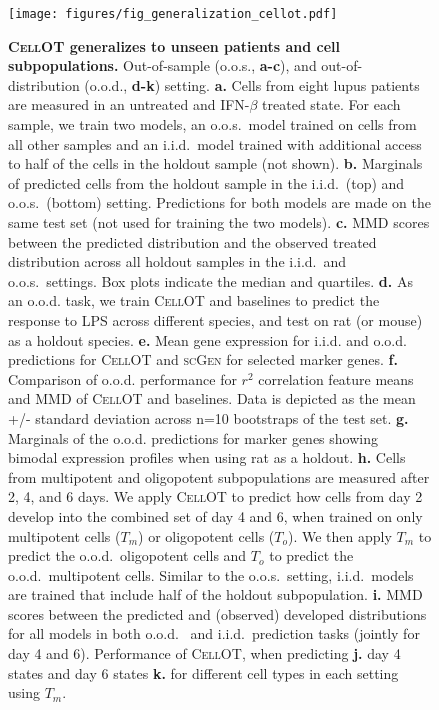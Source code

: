 \begin{figure}
    \centering
    \texttt{[image: figures/fig\_generalization\_cellot.pdf]}
    \caption{
    \textbf{\textsc{CellOT} generalizes to unseen patients and cell subpopulations.} Out-of-sample (o.o.s., \textbf{a-c}), and out-of-distribution (o.o.d., \textbf{d-k}) setting. \textbf{a.} Cells from eight lupus patients are measured in an untreated and IFN-$\beta$ treated state. For each sample, we train two models, an o.o.s.~model trained on cells from all other samples and an i.i.d.~model trained with additional access to half of the cells in the holdout sample (not shown). \textbf{b.} Marginals of predicted cells from the holdout sample in the i.i.d.~(top) and o.o.s.~(bottom) setting. Predictions for both models are made on the same test set (not used for training the two models). \textbf{c.} MMD scores between the predicted distribution and the observed treated distribution across all holdout samples in the i.i.d.~and o.o.s.~settings. Box plots indicate the median and quartiles.
    \textbf{d.} As an o.o.d. task, we train \textsc{CellOT} and baselines to predict the response to LPS across different species, and test on rat (or mouse) as a holdout species. \textbf{e.} Mean gene expression for i.i.d. and o.o.d. predictions for \textsc{CellOT} and \textsc{scGen} for selected marker genes.  \textbf{f.} Comparison of o.o.d. performance for $r^2$ correlation feature means and MMD of \textsc{CellOT} and baselines. Data is depicted as the mean +/- standard deviation across n=10 bootstraps of the test set. \textbf{g.} Marginals of the o.o.d. predictions for marker genes showing bimodal expression profiles when using rat as a holdout.
    \textbf{h.} Cells from multipotent and oligopotent subpopulations are measured after 2, 4, and 6 days. We apply \textsc{CellOT} to predict how cells from day 2 develop into the combined set of day 4 and 6, when trained on only multipotent cells ($T_m$) or oligopotent cells ($T_o$). We then apply $T_m$ to predict the o.o.d.~oligopotent cells and $T_o$ to predict the o.o.d.~multipotent cells. Similar to the o.o.s.~setting, i.i.d.~models are trained that include half of the holdout subpopulation. \textbf{i.} MMD scores between the predicted and (observed) developed distributions for all models in both o.o.d.~ and i.i.d.~prediction tasks (jointly for day 4 and 6). Performance of \textsc{CellOT}, when predicting \textbf{j.} day 4 states and day 6 states \textbf{k.} for different cell types in each setting using $T_m$.} 
    \label{fig:generalization_cellot}
\end{figure}

